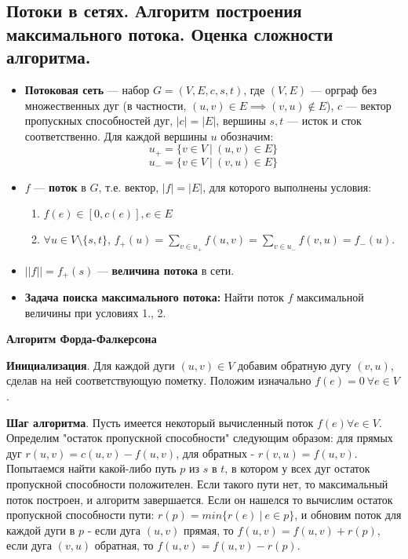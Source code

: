 \subsection{Потоки в сетях. Алгоритм построения максимального потока. Оценка сложности алгоритма.}


\begin{itemize}
    \item \textbf{Потоковая сеть} --- набор $G = (V, E, c, s, t)$, где $(V, E)$ --- орграф без множественных дуг (в частности, $(u,v) \in E \implies (v, u) \notin E$), $c$ --- вектор пропускных способностей дуг, $|c| = |E|$, вершины $s, t$ --- исток и сток соответственно. Для каждой вершины $u$ обозначим:
    $$ u_+ = \{v \in V~|~(u, v) \in E\}$$
    $$u_- = \{v \in V~|~(v, u) \in E\}$$
    \item $f$ --- \textbf{поток} в $G$, т.е. вектор, $|f| = |E|$, для которого выполнены условия:
    \begin{enumerate}
        \item $f(e) \in [0, c(e)], e \in E$
        \item $\forall u \in V \setminus\{s, t\}$, $f_+(u) = \sum_{v \in u_+} f(u, v) = \sum_{v \in u_-} f (v, u) = f_-(u)$.
    \end{enumerate}
    \item $||f|| = f_+(s)$ --- \textbf{величина потока} в сети.
    \item \textbf{Задача поиска максимального потока:}
    Найти поток $f$ максимальной величины при условиях 1., 2.
\end{itemize}

\textbf{Алгоритм Форда-Фалкерсона}

\textbf{Инициализация}.
Для каждой дуги $(u, v) \in V$ добавим обратную дугу $(v, u)$, сделав на ней соответствующую пометку. Положим изначально $f(e) = 0 ~ \forall e \in V$.

\textbf{Шаг алгоритма}.
Пусть имеется некоторый вычисленный поток $f(e) \forall e \in V$. Определим "остаток пропускной способности" следующим образом: для прямых дуг $r(u,v) = c(u,v) - f(u,v)$, для обратных - $r(v,u) = f(u,v)$. Попытаемся найти какой-либо путь $p$ из $s$ в $t$, в котором у всех дуг остаток пропускной способности положителен. Если такого пути нет, то максимальный поток построен, и алгоритм завершается. Если он нашелся то вычислим остаток пропускной способности пути: $r(p) = min\{r(e)~|~e \in p\}$, и обновим поток для каждой дуги в $p$ - если дуга $(u, v)$ прямая, то $f(u, v) = f(u, v) + r(p)$, если дуга $(v, u)$ обратная, то $f(u, v) = f(u, v) - r(p)$. 

